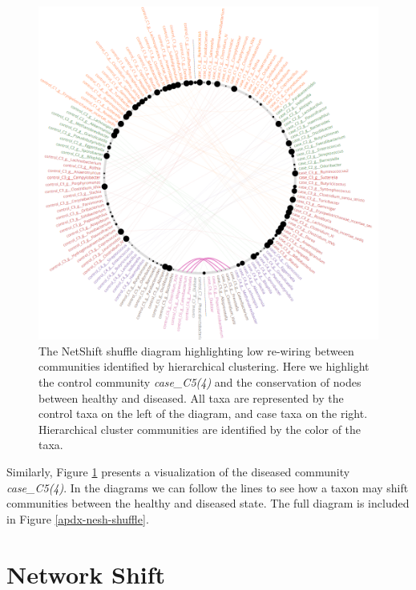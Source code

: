 \begin{figure}[htb!]
    \centering
    \includegraphics[width=1.0\linewidth]{figure/results/no_rewire_network.png}
    \caption[The NetShift shuffle diagram highlighting low re-wiring between communities identified by hierarchical clustering.]{The NetShift shuffle diagram highlighting low re-wiring between communities identified by hierarchical clustering. Here we highlight the control community \textit{case\_C5(4)} and the conservation of nodes between healthy and diseased. All taxa are represented by the control taxa on the left of the diagram, and case taxa on the right. Hierarchical cluster communities are identified by the color of the taxa.}
    \label{fig:res-low}
\end{figure}
Similarly, Figure \ref{fig:res-low} presents a visualization of the diseased community \textit{case\_C5(4)}. In the diagrams we can follow the lines to see how a taxon may shift communities between the healthy and diseased state. The full diagram is included in Figure \ref{apdx-nesh-shuffle}.

\section{Network Shift}\label{res:netshift}

